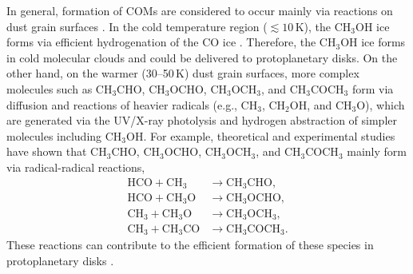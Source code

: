 \documentclass[linenumbers, twocolumn, twocolappendix, astrosymb, times]{aastex631}
\newcommand{\methanol}{CH$_3$OH\xspace}
\newcommand{\acetaldehyde}{CH$_3$CHO\xspace}
\newcommand{\methylformate}{CH$_3$OCHO\xspace}
\newcommand{\dimethylether}{CH$_3$OCH$_3$\xspace}
\newcommand{\acetone}{CH$_3$COCH$_3$\xspace}
\begin{document}
In general, formation of COMs are considered to occur mainly via reactions on dust grain surfaces \citep[][and references therein]{Herbst2009}. In the cold temperature region ($\lesssim 10$\,K), the \methanol ice forms via efficient hydrogenation of the CO ice \citep[e.g.,][]{Tielens1982, Watanabe2002, Watanabe2003}. Therefore, the \methanol ice forms in cold molecular clouds and could be delivered to protoplanetary disks. On the other hand, on the warmer (30--50\,K) dust grain surfaces, more complex molecules such as \acetaldehyde, \methylformate, \dimethylether, and \acetone form via diffusion and reactions of heavier radicals (e.g., CH$_3$, CH$_2$OH, and CH$_3$O), which are generated via the UV/X-ray photolysis and hydrogen abstraction of simpler molecules including \methanol \citep[e.g.,][]{Garrod2006, Garrod2013, Oberg2009, Walsh2014, Furuya2014, Notsu2021}. For example, theoretical and experimental studies \citep[e.g.,][]{Garrod2006, Chuang2016} have shown that \acetaldehyde, \methylformate, \dimethylether, and \acetone mainly form via radical-radical reactions,
\begin{align}
    \mathrm{HCO} + \mathrm{CH_3} &\longrightarrow \mathrm{CH_3CHO}, \label{eq:r-r_reaction1} \\ 
    \mathrm{HCO} + \mathrm{CH_3O} &\longrightarrow \mathrm{CH_3OCHO}, \label{eq:r-r_reaction2} \\
    \mathrm{CH_3} + \mathrm{CH_3O} &\longrightarrow \mathrm{CH_3OCH_3}, \label{eq:r-r_reaction3} \\
    \mathrm{CH_3} + \mathrm{CH_3CO} &\longrightarrow \mathrm{CH_3COCH_3}. \label{eq:r-r_reaction4}
\end{align}
These reactions can contribute to the efficient formation of these species in protoplanetary disks \citep{Walsh2014, Furuya2014}. 


\end{document}
